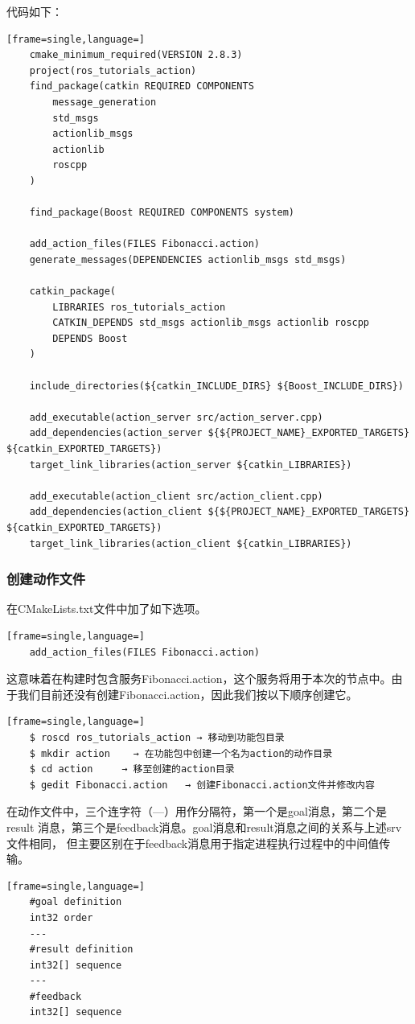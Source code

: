 \documentclass[geye,green,kindle,cn]{elegantnote}
\begin{document}
代码如下：
\begin{lstlisting}[frame=single,language=]
    cmake_minimum_required(VERSION 2.8.3) 
    project(ros_tutorials_action)
    find_package(catkin REQUIRED COMPONENTS  
        message_generation  
        std_msgs  
        actionlib_msgs  
        actionlib  
        roscpp 
    ) 
    
    find_package(Boost REQUIRED COMPONENTS system) 
    
    add_action_files(FILES Fibonacci.action) 
    generate_messages(DEPENDENCIES actionlib_msgs std_msgs) 
    
    catkin_package(  
        LIBRARIES ros_tutorials_action  
        CATKIN_DEPENDS std_msgs actionlib_msgs actionlib roscpp  
        DEPENDS Boost 
    ) 
    
    include_directories(${catkin_INCLUDE_DIRS} ${Boost_INCLUDE_DIRS}) 
    
    add_executable(action_server src/action_server.cpp) 
    add_dependencies(action_server ${${PROJECT_NAME}_EXPORTED_TARGETS} ${catkin_EXPORTED_TARGETS}) 
    target_link_libraries(action_server ${catkin_LIBRARIES}) 
    
    add_executable(action_client src/action_client.cpp) 
    add_dependencies(action_client ${${PROJECT_NAME}_EXPORTED_TARGETS} ${catkin_EXPORTED_TARGETS}) 
    target_link_libraries(action_client ${catkin_LIBRARIES})
\end{lstlisting}
\subsubsection{创建动作文件}
在CMakeLists.txt文件中加了如下选项。 
\begin{lstlisting}[frame=single,language=]
    add_action_files(FILES Fibonacci.action) 
\end{lstlisting}

这意味着在构建时包含服务Fibonacci.action，这个服务将用于本次的节点中。由于我们目前还没有创建Fibonacci.action，因此我们按以下顺序创建它。
\begin{lstlisting}[frame=single,language=]
    $ roscd ros_tutorials_action → 移动到功能包目录 
    $ mkdir action    → 在功能包中创建一个名为action的动作目录 
    $ cd action     → 移至创建的action目录 
    $ gedit Fibonacci.action   → 创建Fibonacci.action文件并修改内容 
\end{lstlisting}

在动作文件中，三个连字符（---）用作分隔符，第一个是goal消息，第二个是result 消息，第三个是feedback消息。goal消息和result消息之间的关系与上述srv文件相同， 但主要区别在于feedback消息用于指定进程执行过程中的中间值传输。
\begin{lstlisting}[frame=single,language=]
    #goal definition 
    int32 order 
    ---
    #result definition 
    int32[] sequence 
    ---
    #feedback 
    int32[] sequence 
\end{lstlisting}
\end{document}

